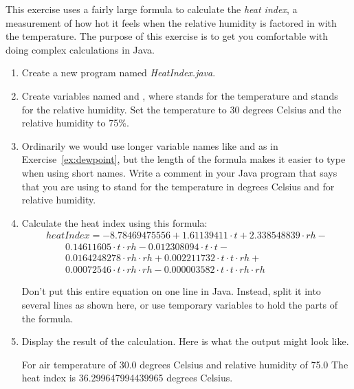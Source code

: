 \begin{exercise}
\label{ex:heatindex}
This exercise uses a fairly large formula to calculate the {\it heat index}, a measurement of how hot it feels when the relative humidity is factored in with the temperature. The purpose of this exercise is to get you comfortable with doing complex calculations in Java.

\begin{enumerate}
\item Create a new program named {\it HeatIndex.java}.

\item Create variables named  and , where  stands for the temperature and  stands for the relative humidity. Set the temperature to 30 degrees Celsius and the relative humidity to 75\%.

\item Ordinarily we would use longer variable names like  and  as in Exercise~\ref{ex:dewpoint}, but the length of the formula makes it easier to type when using short names. Write a comment in your Java program that says that you are using  to stand for the temperature in degrees Celsius and  for relative humidity.

\item Calculate the heat index using this formula:
\begin{equation*}
\begin{array}{l}
heatIndex = -8.78469475556 + 1.61139411\cdot t + 2.338548839\cdot rh - \\
 \qquad {0.14611605}\cdot t \cdot rh - {0.012308094}\cdot t\cdot t - \\
 \qquad {0.0164248278}\cdot rh\cdot rh + 0.002211732\cdot t\cdot t\cdot rh + \\
 \qquad 0.00072546\cdot t\cdot rh\cdot rh {-} {0.000003582} \cdot t\cdot t\cdot rh\cdot rh
\end{array}
\end{equation*}

Don't put this entire equation on one line in Java. Instead, split it into several lines as shown here, or use temporary variables to hold the parts of the formula.

\item Display the result of the calculation. Here is what the output might look like.

\begin{stdout}
For air temperature of 30.0 degrees Celsius
and relative humidity of 75.0%
The heat index is 36.299647994439965 degrees Celsius.
\end{stdout}

\end{enumerate}
\end{exercise}

